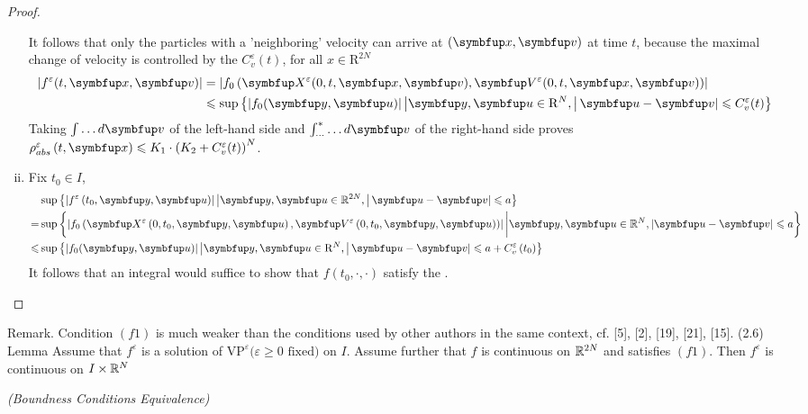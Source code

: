 \begin{lemma}
\begin{proof}
\begin{enumerate}[(i)]
        It follows that only the particles with a 'neighboring' velocity can arrive at $(\vx, \vv)$ at time $t$, because the maximal change of velocity is  controlled by the $C_v^\varepsilon(t)$, for all $x \in \mathrm{R}^{2 N}$
        \[
        \begin{aligned}
        \left|f^{\varepsilon}(t, \vx, \vv)\right| &=\left|f_0\left(\vect{X}^{\varepsilon}(0, t, \vx, \vv), \vect{V}^{\varepsilon}(0, t, \vx, \vv)\right)\right| \\
        & \leqslant \sup \left\{|f_0(\vect{y}, \vect{u})|\left|\vect{y},\vect{u} \in \mathrm{R}^{N},\right| \vect{u}-\vect{v} | \leqslant C_{v}^{\varepsilon}(t)\right\}
        \end{aligned}
        \]
        Taking $\int \ldots d \vv$ of the left-hand side and $\int_{\cdots}^{*} \ldots d \vv$ of the right-hand side proves $\rho^{\varepsilon}_{abs}\left(t, \vx\right) \leqslant K_{1} \cdot\left(K_{2}+C_{v}^{\varepsilon}(t)\right)^{N}$.
        \item Fix $t_0\in I$,
        $$\begin{aligned}
            &\sup \left\{\left|f^{\varepsilon}\left(t_{0}, \vy, \vect{u}\right)\right|\left|\vy, \vect{u} \in \mathbb{R}^{2 N},\right| \vect{u}-\vv | \leqslant a\right\}\\
        =&\sup \left\{\left|f_0\left(  \vect{X}^{\varepsilon}\left(0, t_{0}, \vy, \vect{u}\right), \vect{V}^{\varepsilon}\left(0, t_{0}, \vy, \vect{u}\right) \right) \right|  \bigg| \vy,\vect{u} \in \mathbb{R}^{ N},\left|\vect{u}-\vv\right| \leqslant a\right\}\\
        \leqslant &\sup \left\{|f_0(\vy, \vect{u})|\left|\vy,\vect{u} \in \mathrm{R}^{N},\right| \vect{u}-\vv | \leqslant a+C_{v}^{\varepsilon}\left(t_{0}\right)\right\}
        \end{aligned}$$
        It follows that an integral would suffice to show that $f(t_0, \cdot, \cdot)$ satisfy the \supremumf.
    \end{enumerate}
\end{proof}
Remark. Condition $(f 1)$ is much weaker than the conditions used by other authors in the same context, cf. [5], [2], [19], [21], [15].
(2.6) Lemma Assume that $f^{\varepsilon}$ is a solution of $\text{VP}^{\varepsilon}(\varepsilon \geqslant 0 \text { fixed) on } I$. Assume further that $f$ is continuous on ${\mathbb{R}}^{2 N}$ and satisfies $(f 1) .$ Then $f^{\varepsilon}$ is continuous on $I \times {\mathbb{R}}^{N}$




\begin{theorem}\textit{(Boundness Conditions Equivalence)}


\end{theorem}
\end{lemma}
